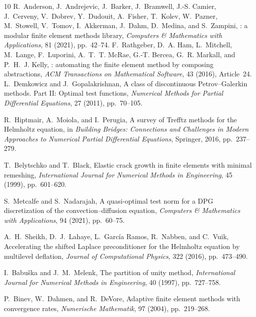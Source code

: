 \documentclass[11pt]{article}
\numberwithin{algorithm}{section}
\theoremstyle{definition}\newtheorem{definition}[theorem]{Definition}
\theoremstyle{remark}\newtheorem{remark}[theorem]{Remark}
\begin{document}
\begin{thebibliography}{10}
R.~Anderson, J.~Andrejevic, J.~Barker, J.~Bramwell, J.-S. Camier,
J.~Cerveny, V.~Dobrev, Y.~Dudouit, A.~Fisher, T.~Kolev, W.~Pazner,
M.~Stowell, V.~Tomov, I.~Akkerman, J.~Dahm, D.~Medina, and S.~Zampini,
: a modular finite element methods library,
\newblock \emph{Computers \& Mathematics with Applications}, 81 (2021),
pp.~42--74.
F.~Rathgeber, D.~A. Ham, L.~Mitchell, M.~Lange, F.~Luporini,
A.~T.~T. McRae, G.-T. Bercea, G.~R. Markall, and P.~H.~J. Kelly,
: automating the finite element method by composing
abstractions,
\newblock \emph{ACM Transactions on Mathematical Software}, 43 (2016),
Article~24.
L.~Demkowicz and J.~Gopalakrishnan,
\newblock A class of discontinuous Petrov--Galerkin methods. Part II: Optimal
test functions,
\newblock \emph{Numerical Methods for Partial Differential Equations}, 27
(2011), pp.~70--105.

R.~Hiptmair, A.~Moiola, and I.~Perugia,
\newblock A survey of Trefftz methods for the Helmholtz equation,
\newblock in \emph{Building Bridges: Connections and Challenges in Modern
Approaches to Numerical Partial Differential Equations}, Springer, 2016,
pp.~237--279.

T.~Belytschko and T.~Black,
\newblock Elastic crack growth in finite elements with minimal remeshing,
\newblock \emph{International Journal for Numerical Methods in Engineering},
45 (1999), pp.~601--620.

S.~Metcalfe and S.~Nadarajah,
\newblock A quasi-optimal test norm for a DPG discretization of the
convection--diffusion equation,
\newblock \emph{Computers \& Mathematics with Applications}, 94 (2021),
pp.~60--75.

A.~H.~Sheikh, D.~J.~Lahaye, L.~Garc\'ia Ramos, R.~Nabben, and C.~Vuik,
\newblock Accelerating the shifted Laplace preconditioner for the Helmholtz
equation by multilevel deflation,
\newblock \emph{Journal of Computational Physics}, 322 (2016), pp.~473--490.

I.~Babu\v{s}ka and J.~M.~Melenk,
\newblock The partition of unity method,
\newblock \emph{International Journal for Numerical Methods in Engineering},
40 (1997), pp.~727--758.

P.~Binev, W.~Dahmen, and R.~DeVore,
\newblock Adaptive finite element methods with convergence rates,
\newblock \emph{Numerische Mathematik}, 97 (2004), pp.~219--268.


\end{thebibliography}
\end{document}
